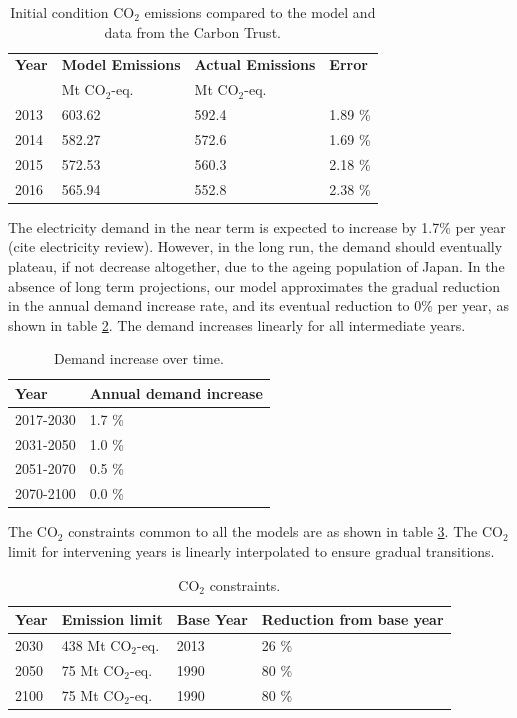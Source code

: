\begin{table}[!ht]
	\caption{Initial condition CO$_2$ emissions compared to the model and data from the Carbon Trust.}
	\vspace{0.1in}
	\begin{tabularx}{\textwidth}{p{} p{} p{} p{}}
		\hline
\textbf{Year} & \textbf{Model Emissions} & \textbf{Actual Emissions} & \textbf{Error} \\
  & Mt CO$_2$-eq. & Mt CO$_2$-eq. &  \\
\hline
2013 & 603.62 & 592.4 & 1.89 \% \\
2014 & 582.27 & 572.6 & 1.69 \% \\
2015 & 572.53 & 560.3 & 2.18 \% \\
2016 & 565.94 & 552.8 & 2.38 \% \\
\hline 
	\end{tabularx}
\label{ic-co2}
\end{table}
The electricity demand in the near term is expected to increase by 1.7\% per year (cite electricity review). However, in the long run, the demand should eventually plateau, if not decrease altogether, due to the ageing population of Japan. In the absence of long term projections, our model approximates the gradual reduction in the annual demand increase rate, and its eventual reduction to 0\% per year, as shown in table \ref{demand}. The demand increases linearly for all intermediate years.

\begin{table}[!ht]
	\caption{Demand increase over time.}
	\vspace{0.1in}
	\begin{tabularx}{\textwidth}{p{} p{}}
		\hline
\textbf{Year} & \textbf{Annual demand increase} \\
\hline
2017-2030 & 1.7 \% \\
2031-2050 & 1.0 \% \\
2051-2070 & 0.5 \% \\
2070-2100 & 0.0 \% \\
\hline 
	\end{tabularx}
\label{demand}
\end{table}
The CO$_2$ constraints common to all the models are as shown in table \ref{co2-limits}. The CO$_2$ limit for intervening years is linearly interpolated to ensure gradual transitions. 
\begin{table}[!ht]
	\caption{CO$_2$ constraints.}
	\vspace{0.1in}
	\begin{tabularx}{\textwidth}{p{} p{}p{} p{}}
		\hline
\textbf{Year} & \textbf{Emission limit} & \textbf{Base Year} & \textbf{Reduction from base year} \\
\hline
2030 & 438 Mt CO$_2$-eq. & 2013 & 26 \% \\
2050 & 75 Mt CO$_2$-eq. & 1990 & 80 \% \\
2100 & 75 Mt CO$_2$-eq. & 1990 & 80 \% \\
\hline 
	\end{tabularx}
\label{co2-limits}
\end{table}

